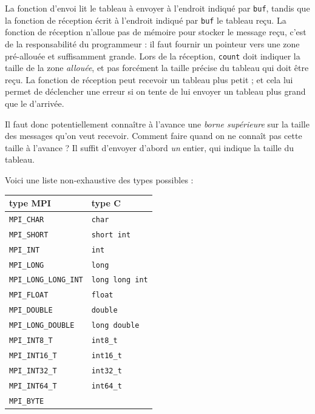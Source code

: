 La fonction d'envoi lit le tableau à envoyer à l'endroit indiqué par
\texttt{buf}, tandis que la fonction de réception écrit à l'endroit indiqué par
\texttt{buf} le tableau reçu. La fonction de réception n'alloue pas de mémoire
pour stocker le message reçu, c'est de la responsabilité du programmeur : il
faut fournir un pointeur vers une zone pré-allouée et suffisamment grande. Lors
de la réception, \texttt{count} doit indiquer la taille de la zone
\emph{allouée}, et pas forcément la taille précise du tableau qui doit être
reçu. La fonction de réception peut recevoir un tableau plus petit ; et cela lui
permet de déclencher une erreur si on tente de lui envoyer un tableau plus grand
que le  d'arrivée.

Il faut donc potentiellement connaître à l'avance une \emph{borne supérieure}
sur la taille des messages qu'on veut recevoir. Comment faire quand on ne
connaît pas cette taille à l'avance ? Il suffit d'envoyer d'abord \emph{un}
entier, qui indique la taille du tableau.

Voici une liste non-exhaustive des types possibles :
\begin{center}
\begin{tabular}{|l|l|}
\hline
  type MPI & type C \\
\hline
\hline
\texttt{MPI\_CHAR} & \texttt{char} \\
\hline
\texttt{MPI\_SHORT} & \texttt{short int} \\
\hline
\texttt{MPI\_INT} & \texttt{int} \\
\hline
\texttt{MPI\_LONG} & \texttt{long} \\
\hline
\texttt{MPI\_LONG\_LONG\_INT} & \texttt{long long int} \\
\hline
\texttt{MPI\_FLOAT} & \texttt{float} \\
\hline
\texttt{MPI\_DOUBLE} & \texttt{double} \\
\hline
\texttt{MPI\_LONG\_DOUBLE} & \texttt{long double} \\
\hline
\texttt{MPI\_INT8\_T} & \texttt{int8\_t} \\
\hline
\texttt{MPI\_INT16\_T} & \texttt{int16\_t} \\
\hline
\texttt{MPI\_INT32\_T} & \texttt{int32\_t} \\
\hline
\texttt{MPI\_INT64\_T} & \texttt{int64\_t} \\
\hline
\texttt{MPI\_BYTE} & \\
\hline
\end{tabular}
\end{center}

